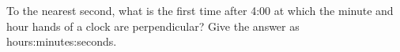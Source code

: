 To the nearest second, what is the first time after 4:00 at which the minute and hour hands of a clock are perpendicular? Give the answer as hours:minutes:seconds.
